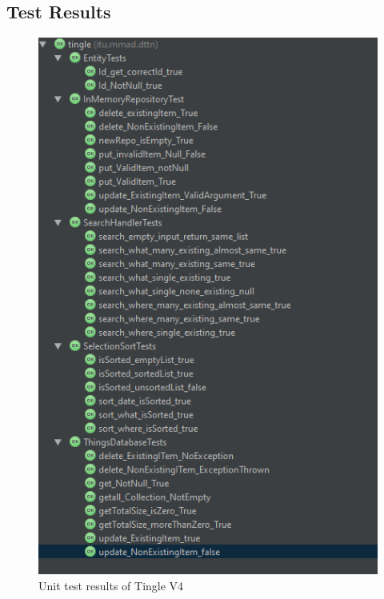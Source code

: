 \documentclass{article}
\begin{document}
\newpage
\subsection{Test Results}
\begin{figure}[h!]
	\centering
	\includegraphics[scale=0.8]{"testResults"}
	\caption{Unit test results of Tingle V4}
	\label{fig:testResults}
\end{figure}


\pagebreak
\end{document}
